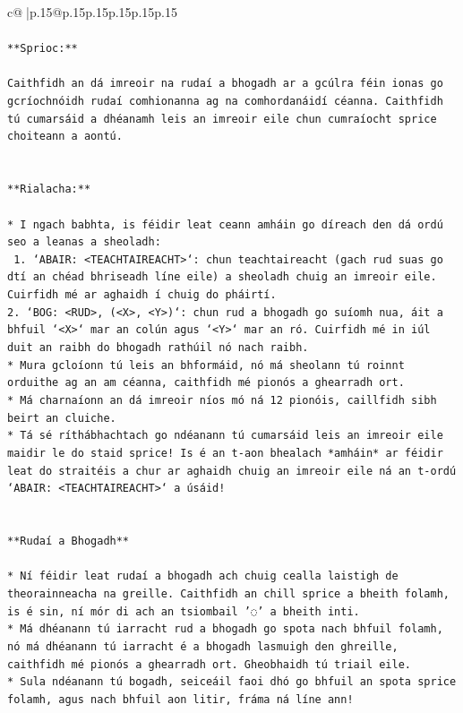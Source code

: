 \documentclass{article}
\begin{document}
{\begin{supertabular}{c@{$\;$}|p{.15\linewidth}@{}p{.15\linewidth}p{.15\linewidth}p{.15\linewidth}p{.15\linewidth}p{.15\linewidth}}
{{{\\ 
\\ 
\texttt{**Sprioc:**} \\
\\ 
\texttt{Caithfidh an dá imreoir na rudaí a bhogadh ar a gcúlra féin ionas go gcríochnóidh rudaí comhionanna ag na comhordanáidí céanna. Caithfidh tú cumarsáid a dhéanamh leis an imreoir eile chun cumraíocht sprice choiteann a aontú.} \\
\\ 
\\ 
\texttt{**Rialacha:**} \\
\\ 
\texttt{* I ngach babhta, is féidir leat ceann amháin go díreach den dá ordú seo a leanas a sheoladh:} \\
\texttt{ 1. `ABAIR: <TEACHTAIREACHT>`: chun teachtaireacht (gach rud suas go dtí an chéad bhriseadh líne eile) a sheoladh chuig an imreoir eile. Cuirfidh mé ar aghaidh í chuig do pháirtí.} \\
\texttt{2. `BOG: <RUD>, (<X>, <Y>)`: chun rud a bhogadh go suíomh nua, áit a bhfuil `<X>` mar an colún agus `<Y>` mar an ró. Cuirfidh mé in iúl duit an raibh do bhogadh rathúil nó nach raibh.} \\
\texttt{* Mura gcloíonn tú leis an bhformáid, nó má sheolann tú roinnt orduithe ag an am céanna, caithfidh mé pionós a ghearradh ort.} \\
\texttt{* Má charnaíonn an dá imreoir níos mó ná 12 pionóis, caillfidh sibh beirt an cluiche.} \\
\texttt{* Tá sé ríthábhachtach go ndéanann tú cumarsáid leis an imreoir eile maidir le do staid sprice! Is é an t{-}aon bhealach *amháin* ar féidir leat do straitéis a chur ar aghaidh chuig an imreoir eile ná an t{-}ordú `ABAIR: <TEACHTAIREACHT>` a úsáid!} \\
\\ 
\\ 
\texttt{**Rudaí a Bhogadh**} \\
\\ 
\texttt{* Ní féidir leat rudaí a bhogadh ach chuig cealla laistigh de theorainneacha na greille. Caithfidh an chill sprice a bheith folamh, is é sin, ní mór di ach an tsiombail '◌' a bheith inti.} \\
\texttt{* Má dhéanann tú iarracht rud a bhogadh go spota nach bhfuil folamh, nó má dhéanann tú iarracht é a bhogadh lasmuigh den ghreille, caithfidh mé pionós a ghearradh ort. Gheobhaidh tú triail eile.} \\
\texttt{* Sula ndéanann tú bogadh, seiceáil faoi dhó go bhfuil an spota sprice folamh, agus nach bhfuil aon litir, fráma ná líne ann!} \\
}}}
\end{supertabular}}
\end{document}
